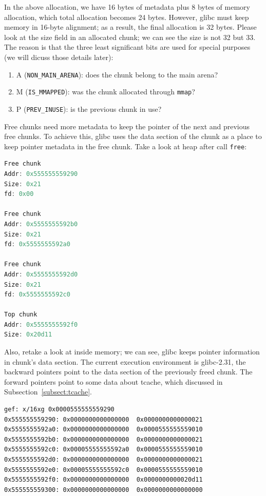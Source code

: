 \documentclass{masterthesis}
\newcommand*\libc{glibc}
\newcommand*\tch{tcache}
\newcommand*\mmapc{\lstinline{mmap}\xspace}
\newcommand{\refToSubSection}[1]{Subsection~\ref{subsect:#1}\xspace}
\begin{document}
In the above allocation, we have 16 bytes of metadata plus 8 bytes of memory allocation, which total allocation becomes 24 bytes. However, \libc{} must keep memory in 16-byte alignment; as a result, the final allocation is 32 bytes. Please look at the size field in an allocated chunk; we can see the size is not 32 but 33. The reason is that the three least significant bits are used for special purposes (we will dicuss those details later):
\begin{enumerate}
	\item A (\lstinline{NON_MAIN_ARENA}): does the chunk belong to the main arena?
	\item M (\lstinline{IS_MMAPPED}): was the chunk allocated through \mmapc{}?
	\item P (\lstinline{PREV_INUSE}): is the previous chunk in use?
\end{enumerate}
Free chunks need more metadata to keep the pointer of the next and previous free chunks. To achieve this, \libc{} uses the data section of the chunk as a place to keep pointer metadata in the free chunk. Take a look at heap after call \lstinline{free}:

\begin{lstlisting}[language=c,frame=tlrb]
Free chunk
Addr: 0x555555559290
Size: 0x21
fd: 0x00

Free chunk
Addr: 0x5555555592b0
Size: 0x21
fd: 0x5555555592a0

Free chunk
Addr: 0x5555555592d0
Size: 0x21
fd: 0x5555555592c0

Top chunk
Addr: 0x5555555592f0
Size: 0x20d11
\end{lstlisting}

Also, retake a look at inside memory; we can see, \libc{} keeps pointer information in chunk's data section. The current execution environment is \libc{-2.31}, the backward pointers point to the data section of the previously freed chunk. The forward pointers point to some data about \tch{}, which discussed in \refToSubSection{tcache}.

\begin{lstlisting}[frame=tlrb]
gef: x/16xg 0x0000555555559290
0x555555559290:	0x0000000000000000	0x0000000000000021
0x5555555592a0:	0x0000000000000000	0x0000555555559010
0x5555555592b0:	0x0000000000000000	0x0000000000000021
0x5555555592c0:	0x00005555555592a0	0x0000555555559010
0x5555555592d0:	0x0000000000000000	0x0000000000000021
0x5555555592e0:	0x00005555555592c0	0x0000555555559010
0x5555555592f0:	0x0000000000000000	0x0000000000020d11
0x555555559300:	0x0000000000000000	0x0000000000000000
\end{lstlisting}
\end{document}
